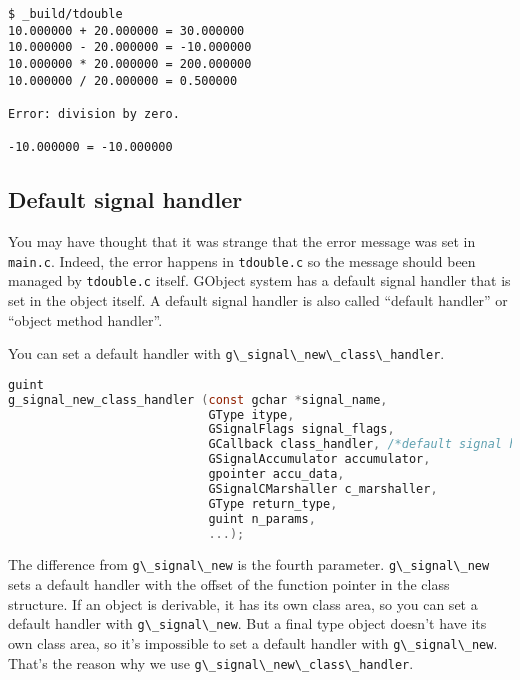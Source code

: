 \begin{lstlisting}
$ _build/tdouble
10.000000 + 20.000000 = 30.000000
10.000000 - 20.000000 = -10.000000
10.000000 * 20.000000 = 200.000000
10.000000 / 20.000000 = 0.500000

Error: division by zero.

-10.000000 = -10.000000
\end{lstlisting}

\subsection{Default signal handler}\label{default-signal-handler}

You may have thought that it was strange that the error message was set
in \passthrough{\lstinline!main.c!}. Indeed, the error happens in
\passthrough{\lstinline!tdouble.c!} so the message should been managed
by \passthrough{\lstinline!tdouble.c!} itself. GObject system has a
default signal handler that is set in the object itself. A default
signal handler is also called ``default handler'' or ``object method
handler''.

You can set a default handler with
\passthrough{\lstinline!g\_signal\_new\_class\_handler!}.

\begin{lstlisting}[language=C]
guint
g_signal_new_class_handler (const gchar *signal_name,
                            GType itype,
                            GSignalFlags signal_flags,
                            GCallback class_handler, /*default signal handler */
                            GSignalAccumulator accumulator,
                            gpointer accu_data,
                            GSignalCMarshaller c_marshaller,
                            GType return_type,
                            guint n_params,
                            ...);
\end{lstlisting}

The difference from \passthrough{\lstinline!g\_signal\_new!} is the
fourth parameter. \passthrough{\lstinline!g\_signal\_new!} sets a
default handler with the offset of the function pointer in the class
structure. If an object is derivable, it has its own class area, so you
can set a default handler with \passthrough{\lstinline!g\_signal\_new!}.
But a final type object doesn't have its own class area, so it's
impossible to set a default handler with
\passthrough{\lstinline!g\_signal\_new!}. That's the reason why we use
\passthrough{\lstinline!g\_signal\_new\_class\_handler!}.


